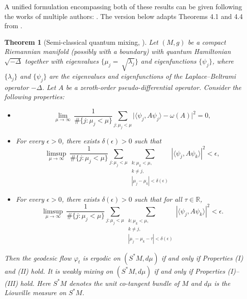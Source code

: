 \documentclass[11pt,twoside,reqno]{amsart} \usepackage{a4wide} \usepackage[T1]{fontenc} \usepackage[utf8]{inputenc} \usepackage{soul}  \usepackage{amsmath} \usepackage{amsfonts} \usepackage{amssymb} \usepackage{mathtools} \usepackage{amsthm} \usepackage{xcolor} \usepackage{graphicx} \usepackage{hyperref} \usepackage{standalone} \usepackage{esint} \usepackage{comment} \usepackage[left=2.3cm,top=3cm,right=2.3cm]{geometry} \usepackage{bm} \usepackage{svg} \usepackage{float} \numberwithin{equation}{section} \theoremstyle{plain} \newtheorem{thm}{Theorem}[section] \newtheorem{theorem}[thm]{Theorem} \newtheorem*{theorem*}{Theorem}\newtheorem{conj}[thm]{Conjecture} \newtheorem{lemma}[thm]{Lemma} \newtheorem{prop}[thm]{Proposition} \newtheorem{proposition}[thm]{Proposition} \newtheorem{cor}[thm]{Corollary} \newtheorem{question}[thm]{Question} \newtheorem{corollary}[thm]{Corollary} \newtheorem{assumption}[thm]{Assumption} \theoremstyle{definition} \newtheorem{defn}[thm]{Definition} \newtheorem{choice}[thm]{Choice} \newtheorem{definition}[thm]{Definition} \newtheorem{ex}[thm]{Example} \newtheorem{notation}[thm]{Notation} \newtheorem*{ack}{Acknowledgements} \theoremstyle{remark} \newtheorem{remark}[thm]{Remark} \newtheorem{bigremark}[thm]{Remark} \usepackage{xcolor} \newcommand{\red}[1]{ {\color{Red}#1} } \newcommand{\blue}[1]{ {\color{Blue}#1} } \author{Kai Hippi} \address{Aalto University, Espoo, Finland} \email{kai.hippi@aalto.fi}
\begin{document}
A unified formulation encompassing both of these results can be given following the works of multiple authors: \cite{Shn74, CdV85, Zel87, Zel90, GL93, LS93, Zel96b, Zel96a, ZZ96, Sun97}. The version below adapts Theorems 4.1 and 4.4 from \cite{Zel05}.

\begin{theorem}[Semi-classical quantum mixing, {\cite{Sun97, Zel05}}]
\label{Thm: Quantum ergodicity and quantum weak mixing}
Let $(M,g)$ be a compact Riemannian manifold (possibly with a boundary) with quantum Hamiltonian $ \sqrt{-\Delta} $ together with eigenvalues $ \{ \mu_{j} =~\sqrt{\lambda_{j}} \} $ and eigenfunctions $ \{ \psi_{j} \} $, where $ \{ \lambda_{j} \} $ and $ \{ \psi_{j} \} $ are the eigenvalues and eigenfunctions of the Laplace--Beltrami operator $ -\Delta $. Let $A$ be a zeroth-order pseudo-differential operator. Consider the following properties:
\begin{itemize}
    \item[(I)] 
    $$\displaystyle \lim_{ \mu \to \infty} \ \frac{1}{ \# \{ j :  \mu_{j} < \mu \} } \sum_{j: \mu_j < \mu } 
    \big| \langle \psi_j, A \psi_j \rangle - \omega(A) \big|^2  = 0,$$
    \item[(II)] 
    For every $\epsilon > 0$, there exists $\delta(\epsilon) > 0$ such that
    \[
    \limsup_{  \mu \to \infty} \ \frac{1}{ \# \{ j  :  \mu_{j} < \mu \} } 
    \sum_{j: \mu_j < \mu} 
    \sum_{\substack{k: \mu_k < \mu, \\ k \neq j , \\ |\mu_j - \mu_k| < \delta(\epsilon)}} 
    \left|\langle \psi_j, A \psi_k \rangle \right|^2  < \epsilon,
    \]
    \item[(III)] 
    For every $\epsilon > 0$, there exists $\delta(\epsilon) > 0$ such that for all $\tau \in \mathbb{R}$,
    \[
    \limsup_{\mu \to \infty} \ \frac{1}{ \# \{ j  :  \mu_{j} < \mu \} } 
    \sum_{j: \mu_{j} < \mu} 
    \sum_{\substack{ k: \mu_{k} < \mu , \\ k \neq j ,\\ | \mu_j - \mu_k - \tau| < \delta(\epsilon)}} 
    |\langle \psi_j, A \psi_k \rangle|^2  < \epsilon.
    \]
\end{itemize}
Then the geodesic flow $\varphi_t$ is ergodic on $(S^*M, d\mu)$ if and only if Properties {(I)} and {(II)} hold. It is weakly mixing on $(S^*M, d\mu)$ if and only if Properties {(I)}--{(III)} hold. Here $S^*M$ denotes the unit co-tangent bundle of $M$ and $d\mu$ is the Liouville measure on $S^*M$.
\end{theorem}
\end{document}
